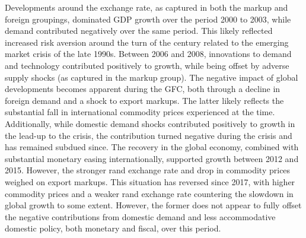 \documentclass[a4paper,11pt]{article}
\numberwithin{equation}{section}
\begin{document}
	\begin{figure}[t]	
		 \label{fig_hist_decom}
	\end{figure}
	
	Developments around the exchange rate, as captured in both the markup and foreign groupings, dominated GDP growth over the period 2000 to 2003, while demand contributed negatively over the same period. This likely reflected increased risk aversion around the turn of the century related to the emerging market crisis of the late 1990s. Between 2006 and 2008, innovations
	to demand and technology contributed positively to growth, while being offset by adverse supply shocks (as captured in the markup group). The negative impact of global developments becomes apparent during the GFC, both through a decline in foreign demand and a shock to export markups. The latter likely reflects the substantial fall in international commodity prices experienced at the time. Additionally, while domestic demand shocks contributed positively to growth in the lead-up to the crisis, the contribution turned negative during the crisis and has remained subdued since. The recovery in the global economy, combined with substantial monetary easing internationally, supported growth between 2012 and 2015. However, the stronger rand exchange rate and drop in commodity prices weighed on export markups. This situation has reversed since 2017, with higher commodity prices and a weaker rand exchange rate countering the slowdown in global growth to some extent. However, the former does not appear to fully offset the negative contributions from domestic demand and less accommodative domestic policy, both monetary and fiscal, over this period.
	
\end{document}
